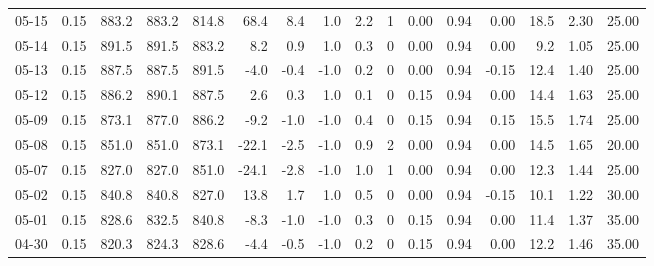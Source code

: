 \begin{threeparttable}
{\begin{tabular}{lrrrrrrrrrrrrrrr}
  05-15 &     0.15 & 883.2 & 883.2 & 814.8 &       68.4 &            8.4 &                      1.0 &                 2.2 &              1 &       0.00 &      0.94 &           0.00 &             18.5 &            2.30 &                  25.00 \\
  05-14 &     0.15 & 891.5 & 891.5 & 883.2 &        8.2 &            0.9 &                      1.0 &                 0.3 &              0 &       0.00 &      0.94 &           0.00 &              9.2 &            1.05 &                  25.00 \\
  05-13 &     0.15 & 887.5 & 887.5 & 891.5 &       -4.0 &           -0.4 &                     -1.0 &                 0.2 &              0 &       0.00 &      0.94 &          -0.15 &             12.4 &            1.40 &                  25.00 \\
  05-12 &     0.15 & 886.2 & 890.1 & 887.5 &        2.6 &            0.3 &                      1.0 &                 0.1 &              0 &       0.15 &      0.94 &           0.00 &             14.4 &            1.63 &                  25.00 \\
  05-09 &     0.15 & 873.1 & 877.0 & 886.2 &       -9.2 &           -1.0 &                     -1.0 &                 0.4 &              0 &       0.15 &      0.94 &           0.15 &             15.5 &            1.74 &                  25.00 \\
  05-08 &     0.15 & 851.0 & 851.0 & 873.1 &      -22.1 &           -2.5 &                     -1.0 &                 0.9 &              2 &       0.00 &      0.94 &           0.00 &             14.5 &            1.65 &                  20.00 \\
  05-07 &     0.15 & 827.0 & 827.0 & 851.0 &      -24.1 &           -2.8 &                     -1.0 &                 1.0 &              1 &       0.00 &      0.94 &           0.00 &             12.3 &            1.44 &                  25.00 \\
  05-02 &     0.15 & 840.8 & 840.8 & 827.0 &       13.8 &            1.7 &                      1.0 &                 0.5 &              0 &       0.00 &      0.94 &          -0.15 &             10.1 &            1.22 &                  30.00 \\
  05-01 &     0.15 & 828.6 & 832.5 & 840.8 &       -8.3 &           -1.0 &                     -1.0 &                 0.3 &              0 &       0.15 &      0.94 &           0.00 &             11.4 &            1.37 &                  35.00 \\
  04-30 &     0.15 & 820.3 & 824.3 & 828.6 &       -4.4 &           -0.5 &                     -1.0 &                 0.2 &              0 &       0.15 &      0.94 &           0.00 &             12.2 &            1.46 &                  35.00 \\

\end{tabular}}
\end{threeparttable}
